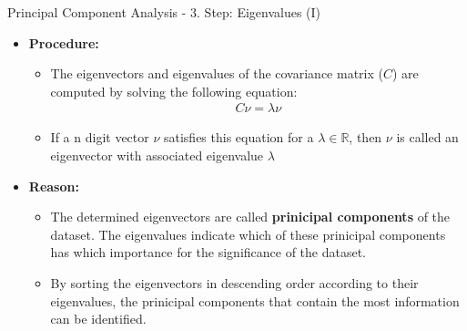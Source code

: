\begin{frame}{Principal Component Analysis - 3. Step: Eigenvalues (I)}
	\begin{itemize}
		\item \textbf{Procedure:}
		      \begin{itemize}
			      \item The eigenvectors and eigenvalues of the covariance matrix
			            ($C$) are computed by solving the following equation:
			            \begin{align}
				            C \nu = \lambda \nu
			            \end{align}
			      \item If a n digit vector $\nu$ satisfies this equation for a
			            $\lambda \in \mathbb{R}$, then $\nu$ is called an eigenvector with
			            associated eigenvalue $\lambda$
		      \end{itemize}
		\item \textbf{Reason:}
		      \begin{itemize}
			      \item The determined eigenvectors are called \textbf{prinicipal
				            components} of the dataset. The eigenvalues indicate which of these
			            prinicipal components has which importance for the significance of
			            the dataset.
			      \item By sorting the eigenvectors in descending order according to
			            their eigenvalues, the prinicipal components that contain the most
			            information can be identified.
		      \end{itemize}
	\end{itemize}
\end{frame}


